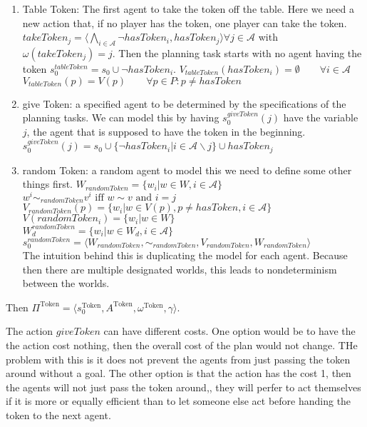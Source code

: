 \begin{enumerate}
  \item Table Token:
    The first agent to take the token off the table. Here we need a new action that, if no player has the token, one player can take the token.\\
    $takeToken_j=\langle \bigwedge\limits_{i \in \mathcal{A}}
    \neg hasToken_i, hasToken_j \rangle \forall j \in \mathcal{A}$ with $\omega(takeToken_j)=j$. Then the planning task starts with no agent having the token
    $s_0^{tableToken} = s_0 \cup \neg hasToken_i$.
    $V_{tableToken}(hasToken_i)=\emptyset \qquad \forall i\in \mathcal{A}$\\
    $V_{tableToken}(p)=V(p) \qquad \forall p\in P : p \not = hasToken$

  \item give Token:
    a specified agent to be determined by the specifications of the planning tasks. We can model this by having $s_0^{giveToken}(j)$ have the variable $j$, the agent that is supposed to have the token in the beginning.
     $s_0^{giveToken}(j) = s_0 \cup \{\neg hasToken_i|i \in \mathcal{A} \backslash j\} \cup hasToken_j$

  \item random Token:
    a random agent
    to model this we need to define some other things first.
    $W_{randomToken}=\{w_i|w \in W, i\in \mathcal{A}\}$ \\
    $w^i \sim_{randomToken} v^i \text{ iff } w \sim v \text{ and } i=j$ \\
    $V_{randomToken}(p)=\{w_i|w\in V(p), p \not = hasToken, i\in \mathcal{A}\}$ \\
    $V(randomToken_i)=\{w_i|w \in W\}$ \\
    $W^{randomToken}_d=\{w_i|w\in W_d, i\in \mathcal{A}\}$ \\
    $s_0^{randomToken}=\langle W_{randomToken}, \sim_{randomToken}, V_{randomToken}, W_{randomToken} \rangle$ \\
    The intuition behind this is duplicating the model for each agent. Because then there are multiple designated worlds, this leads to nondeterminism between the worlds.
\end{enumerate}



Then $ \Pi^{\text{Token}} = \langle s_0^{\text{Token}}, A ^{\text{Token}}, \omega ^{\text{Token}}, \gamma \rangle $.

The action $giveToken$ can have different costs. One option would be to have the the action cost nothing, then the overall cost of the plan would not change. THe problem with this is it does not prevent the agents from just passing the token around without a goal. The other option is that the action has the cost 1, then the agents will not just pass the token around,, they will perfer to act themselves if it is more or equally efficient than to let someone else act before handing the token to the next agent.

